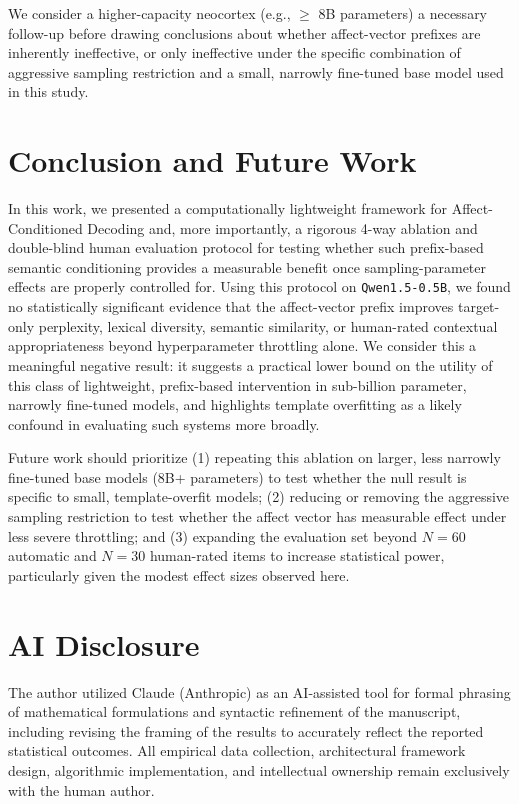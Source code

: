 \documentclass[10pt,twocolumn]{article}
\begin{document}
We consider a higher-capacity neocortex (e.g., $\geq$ 8B parameters) a necessary follow-up before drawing conclusions about whether affect-vector prefixes are inherently ineffective, or only ineffective under the specific combination of aggressive sampling restriction and a small, narrowly fine-tuned base model used in this study.


\section{Conclusion and Future Work}
In this work, we presented a computationally lightweight framework for Affect-Conditioned Decoding and, more importantly, a rigorous 4-way ablation and double-blind human evaluation protocol for testing whether such prefix-based semantic conditioning provides a measurable benefit once sampling-parameter effects are properly controlled for. Using this protocol on \texttt{Qwen1.5-0.5B}, we found no statistically significant evidence that the affect-vector prefix improves target-only perplexity, lexical diversity, semantic similarity, or human-rated contextual appropriateness beyond hyperparameter throttling alone. We consider this a meaningful negative result: it suggests a practical lower bound on the utility of this class of lightweight, prefix-based intervention in sub-billion parameter, narrowly fine-tuned models, and highlights template overfitting as a likely confound in evaluating such systems more broadly.

Future work should prioritize (1) repeating this ablation on larger, less narrowly fine-tuned base models (8B+ parameters) to test whether the null result is specific to small, template-overfit models; (2) reducing or removing the aggressive sampling restriction to test whether the affect vector has measurable effect under less severe throttling; and (3) expanding the evaluation set beyond $N=60$ automatic and $N=30$ human-rated items to increase statistical power, particularly given the modest effect sizes observed here.


\section*{AI Disclosure}
The author utilized Claude (Anthropic) as an AI-assisted tool for formal phrasing of mathematical formulations and syntactic refinement of the manuscript, including revising the framing of the results to accurately reflect the reported statistical outcomes. All empirical data collection, architectural framework design, algorithmic implementation, and intellectual ownership remain exclusively with the human author.
\end{document}
